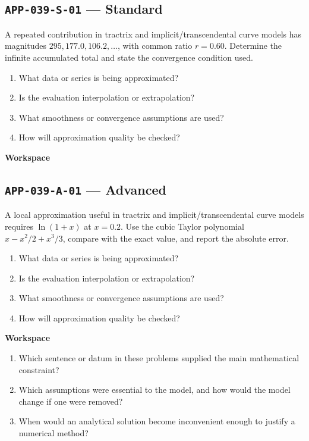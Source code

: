 \documentclass[11pt]{book}
\newcommand{\pid}[1]{\texttt{#1}}
\newcommand{\workspace}{\par\vspace{0.7in}\hrulefill\par\vspace{0.55in}\hrulefill\par}
\begin{document}
\subsection*{\pid{APP-039-S-01} — Standard}
\begin{problembox}
A repeated contribution in tractrix and implicit/transcendental curve models has magnitudes $295, 177.0, 106.2,\ldots$, with common ratio $r=0.60$. Determine the infinite accumulated total and state the convergence condition used.
\end{problembox}
\begin{promptbox}\begin{enumerate}
\item What data or series is being approximated?
\item Is the evaluation interpolation or extrapolation?
\item What smoothness or convergence assumptions are used?
\item How will approximation quality be checked?
\end{enumerate}\end{promptbox}
\textbf{Workspace}\workspace
{}
\subsection*{\pid{APP-039-A-01} — Advanced}
\begin{problembox}
A local approximation useful in tractrix and implicit/transcendental curve models requires $\ln(1+x)$ at $x=0.2$. Use the cubic Taylor polynomial $x-x^2/2+x^3/3$, compare with the exact value, and report the absolute error.
\end{problembox}
\begin{promptbox}\begin{enumerate}
\item What data or series is being approximated?
\item Is the evaluation interpolation or extrapolation?
\item What smoothness or convergence assumptions are used?
\item How will approximation quality be checked?
\end{enumerate}\end{promptbox}
\textbf{Workspace}\workspace
\begin{reflectionbox}\begin{enumerate}
\item Which sentence or datum in these problems supplied the main mathematical constraint?
\item Which assumptions were essential to the model, and how would the model change if one were removed?
\item When would an analytical solution become inconvenient enough to justify a numerical method?
\end{enumerate}\end{reflectionbox}
\end{document}
